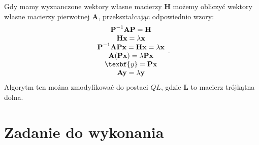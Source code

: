 \documentclass{article}
\begin{document}
Gdy mamy wyznanczone wektory własne macierzy \textbf{H} możemy obliczyć wektory własne macierzy pierwotnej \textbf{A}, przekształcając odpowiednio wzory:
\begin{equation}
\begin{array}{c}
\textbf{P}^{-1}\textbf{AP} = \textbf{H} \\
\textbf{Hx} = \lambda \textbf{x} \\
\textbf{P}^{-1}\textbf{APx} = \textbf{Hx} = \lambda \textbf{x}  \\
\textbf{A}(\textbf{Px}) = \lambda\textbf{Px} \\
\texbf{y} = \textbf{Px} \\
\textbf{Ay} = \lambda \textbf{y}
\end{array}.
\end{equation}
Algorytm ten można zmodyfikować do postaci $QL$, gdzie \textbf{L} to macierz trójkątna dolna. 

\section{Zadanie do wykonania}
\end{document}
